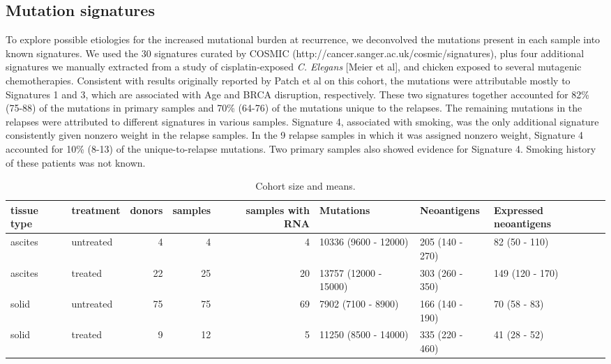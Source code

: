 \subsection*{Mutation signatures}
To explore possible etiologies for the increased mutational burden at recurrence, we deconvolved the mutations present in each sample into known signatures. We used the 30 signatures curated by COSMIC (http://cancer.sanger.ac.uk/cosmic/signatures), plus four additional signatures we manually extracted from a study of cisplatin-exposed \textit{C. Elegans} [Meier et al], and chicken exposed to several mutagenic chemotherapies. Consistent with results originally reported by Patch et al on this cohort, the mutations were attributable mostly to Signatures 1 and 3, which are associated with Age and BRCA disruption, respectively. These two signatures together accounted for 82\% (75-88) of the mutations in primary samples and 70\% (64-76) of the mutations unique to the relapses. The remaining mutations in the relapses were attributed to different signatures in various samples. Signature 4, associated with smoking, was the only additional signature consistently given nonzero weight in the relapse samples. In the 9 relapse samples in which it was assigned nonzero weight, Signature 4 accounted for 10\% (8-13) of the unique-to-relapse mutations. Two primary samples also showed evidence for Signature 4. Smoking history of these patients was not known.



\begin{table}
\begin{tabular}{llrrrlll}
\toprule
tissue type &  treatment &  donors &  samples &  samples with RNA &              Mutations &      Neoantigens & Expressed neoantigens \\
\midrule
    ascites &  untreated &       4 &        4 &                 4 &   10336 (9600 - 12000) &  205 (140 - 270) &         82 (50 - 110) \\
    ascites &    treated &      22 &       25 &                20 &  13757 (12000 - 15000) &  303 (260 - 350) &       149 (120 - 170) \\
      solid &  untreated &      75 &       75 &                69 &     7902 (7100 - 8900) &  166 (140 - 190) &          70 (58 - 83) \\
      solid &    treated &       9 &       12 &                 5 &   11250 (8500 - 14000) &  335 (220 - 460) &          41 (28 - 52) \\
\bottomrule
\end{tabular}
\caption{Cohort size and means.}
\label{tab:cohort}
\end{table}

